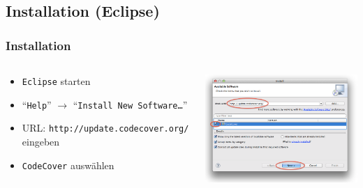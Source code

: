 \documentclass{beamer}
\begin{document}
  \subsection{Installation (Eclipse)}
  \begin{frame}
    \frametitle{Installation}
    \begin{columns}
      \begin{column}{4cm}
        \begin{itemize}
          \item \texttt{Eclipse} starten
          \item ``\texttt{Help}'' $\rightarrow$ ``\texttt{Install New Software\dots}''
          \item URL: \texttt{http://update.code\-cover.org/} eingeben
          \item \texttt{CodeCover} auswählen
        \end{itemize}
        \vspace{2cm}
      \end{column}
      \begin{column}{6cm}
        \begin{overprint}
          \includegraphics[width=7cm]{pictures/install.png}
        \end{overprint}
      \end{column}
    \end{columns}
  \end{frame}
\end{document}
